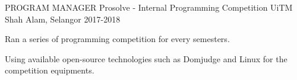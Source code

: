 \begin{cventries}
  \cventry
    {PROGRAM MANAGER}
    {Prosolve - Internal Programming Competition}
    {UiTM Shah Alam, Selangor}
    {2017-2018}
    {
      \begin{cvitems}
        \item {Ran a series of programming competition for every semesters.}
        \item {Using available open-source technologies such as Domjudge and Linux for the competition equipments.}
      \end{cvitems}
    }

\end{cventries}
